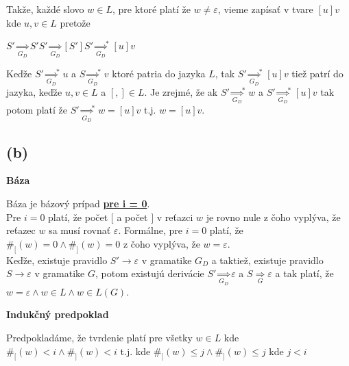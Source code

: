\documentclass[11pt,a4paper]{article}
\begin{document}
Takže, každé slovo $w \in L$, pre ktoré platí že $w \neq \varepsilon$, vieme zapísať v tvare $[u]v$ kde $u,v \in L$ pretože

\begin{center}
$S' \underset{G_D}{\Rightarrow} S'S' \underset{G_D}{\Rightarrow} [S']S' {\underset{G_D}{\Rightarrow}}^{*} [u]v$
\end{center}

Keďže $S' {\underset{G_D}{\Rightarrow}}^* u$ a $S {\underset{G_D}{\Rightarrow}}^* v$ ktoré patria do jazyka $L$, tak $S' {\underset{G_D}{\Rightarrow}}^* [u]v$ tiež patrí do jazyka, keďže $u, v \in L$ a $[,] \in L$. Je zrejmé, že ak $S' {\underset{G_D}{\Rightarrow}}^* w$ a $S' {\underset{G_D}{\Rightarrow}}^* [u]v$ tak potom platí že $S' {\underset{G_D}{\Rightarrow}}^* w = [u]v$ t.j. $w = [u]v$.

\subsection{(b)}

\textbf{Báza}
\begin{flushright}
\begin{minipage}{0.95\textwidth}
    Báza je bázový prípad \underline{\textbf{pre i = 0}}.\\

    Pre $i=0$ platí, že počet $[$ a počet $]$ v reťazci $w$ je rovno nule z čoho vyplýva, že reťazec $w$ sa musí rovnať $\varepsilon$. Formálne, pre $i=0$ platí, že $\#_{[}(w) = 0 \wedge \#_{]}(w) = 0$ z čoho vyplýva, že $w = \varepsilon$.\\

    Keďže, existuje pravidlo $S' \rightarrow \varepsilon$ v gramatike $G_D$ a taktiež, existuje pravidlo $S \rightarrow \varepsilon$ v gramatike $G$, potom existujú derivácie $S' \underset{G_D}{\Rightarrow} \varepsilon$ a $S \underset{G}{\Rightarrow} \varepsilon$ a tak platí, že $w = \varepsilon \wedge w \in L \wedge w \in L(G)$.
\end{minipage}
\end{flushright}

\textbf{Indukčný predpoklad}
\begin{flushright}
\begin{minipage}{0.95\textwidth}
    Predpokladáme, že tvrdenie platí pre všetky $w \in L$ kde $\#_[(w) < i \wedge \#_](w) < i$ t.j. kde $\#_[(w) \leq j \wedge \#_](w) \leq j$ kde $j<i$\\
\end{minipage}
\end{flushright}
\end{document}
